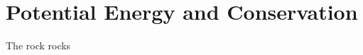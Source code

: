 \documentclass{scrartcl}
\begin{document}
    \section{Potential Energy and Conservation}
	The rock rocks
\end{document}
